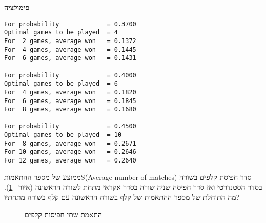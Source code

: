 \textbf{סימולציה}
\begin{verbatim}
For probability             = 0.3700
Optimal games to be played  = 4
For  2 games, average won   = 0.1372
For  4 games, average won   = 0.1445
For  6 games, average won   = 0.1431

For probability             = 0.4000
Optimal games to be played  = 6
For  4 games, average won   = 0.1820
For  6 games, average won   = 0.1845
For  8 games, average won   = 0.1680

For probability             = 0.4500
Optimal games to be played  = 10
For  8 games, average won   = 0.2671
For 10 games, average won   = 0.2646
For 12 games, average won   = 0.2640
\end{verbatim}


\begin{prob}{ממוצע של מספר ההתאמות}{S}{(Average number of matches)}
סדר חפיסת קלפים בשורה בסדר הסטנדרטי ואז סדר חפיסה שניה שורה בסדר אקראי מתחת לשורה הראשונה (איור%
~\ref{f.cards}).
מה התוחלת של מספר ההתאמות של קלף בשורה הראשונה עם קלף בשורה מתחתיו?
\end{prob}

\begin{figure}[tb]
\begin{center}
\end{center}
\caption{התאמת שתי חפיסות קלפים}\label{f.cards}
\end{figure}

